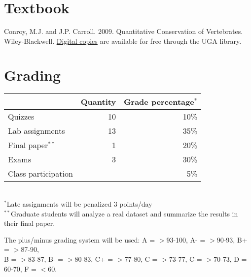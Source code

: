 \documentclass[12pt]{article}
\begin{document}
\vspace{-3mm}
\section*{\normalsize Textbook}
\vspace{-4mm}
Conroy, M.J. and J.P. Carroll. 2009. Quantitative Conservation of
Vertebrates. Wiley-Blackwell. \href{http://preproxy.galib.uga.edu/login?url=http://onlinelibrary.wiley.com/book/10.1002/9781444303155}{Digital
  copies} are available for free through the UGA library. 

\vspace{-3mm}
\section*{\normalsize Grading}
\vspace{-4mm}
\begin{center}
  \begin{tabular}[h!]{lrr}
    \hline
                        & Quantity & Grade percentage$^*$        \\
    \hline
    Quizzes             & 10       & 10\%                        \\
    Lab assignments     & 13       & 35\%                        \\
    Final paper$^{**}$  & 1        & 20\%                        \\
    Exams               & 3        & 30\%                        \\
    Class participation &          & 5\%                         \\
    \hline
  \end{tabular}                                                  \\
  \small
\hspace{0mm} $^*$Late assignments will be penalized 3 points/day \\ 
\hspace{0mm} $^{**}$Graduate students will analyze a real dataset and
summarize the results in their final paper.
\end{center}
\vspace{-6pt}
{%
The plus/minus grading system will be used: %
A = $>$93-100, A- = $>$90-93, B+ = $>$87-90,                     \\ B = $>$83-87,
B- = $>$80-83, C+ = $>$77-80, C = $>$73-77, C-= $>$70-73, D = 60-70, F = $<$60. 
}
\end{document}
